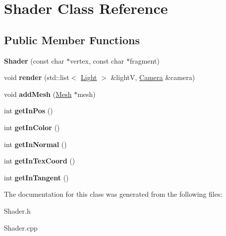 \hypertarget{class_shader}{}\section{Shader Class Reference}
\label{class_shader}
\subsection*{Public Member Functions}
\begin{DoxyCompactItemize}
\item 
\hypertarget{class_shader_a7e02f1eaec796a7fc02c3191ce9fa5d4}{}{\bfseries Shader} (const char $\ast$vertex, const char $\ast$fragment)\label{class_shader_a7e02f1eaec796a7fc02c3191ce9fa5d4}

\item 
\hypertarget{class_shader_a4bb445563c154a27e3dc0e1036690841}{}void {\bfseries render} (std\+::list$<$ \hyperlink{class_light}{Light} $>$ \&light\+V, \hyperlink{class_camera}{Camera} \&camera)\label{class_shader_a4bb445563c154a27e3dc0e1036690841}

\item 
\hypertarget{class_shader_ab6af37727a2f0a0e5f31fb05e9137853}{}void {\bfseries add\+Mesh} (\hyperlink{class_mesh}{Mesh} $\ast$mesh)\label{class_shader_ab6af37727a2f0a0e5f31fb05e9137853}

\item 
\hypertarget{class_shader_ad52dea081c158e54bd3dcd5168623a3f}{}int {\bfseries get\+In\+Pos} ()\label{class_shader_ad52dea081c158e54bd3dcd5168623a3f}

\item 
\hypertarget{class_shader_ae39ec6d01ef565e170cce67c75d3fa3d}{}int {\bfseries get\+In\+Color} ()\label{class_shader_ae39ec6d01ef565e170cce67c75d3fa3d}

\item 
\hypertarget{class_shader_a9647f6a0356188f9f56787dbebde4731}{}int {\bfseries get\+In\+Normal} ()\label{class_shader_a9647f6a0356188f9f56787dbebde4731}

\item 
\hypertarget{class_shader_a386214ac36c08a8405ec458f75d17d12}{}int {\bfseries get\+In\+Tex\+Coord} ()\label{class_shader_a386214ac36c08a8405ec458f75d17d12}

\item 
\hypertarget{class_shader_aad0dc2b502af0bcf6c5aa99e60fc296a}{}int {\bfseries get\+In\+Tangent} ()\label{class_shader_aad0dc2b502af0bcf6c5aa99e60fc296a}

\end{DoxyCompactItemize}


The documentation for this class was generated from the following files\+:\begin{DoxyCompactItemize}
\item 
Shader.\+h\item 
Shader.\+cpp\end{DoxyCompactItemize}
